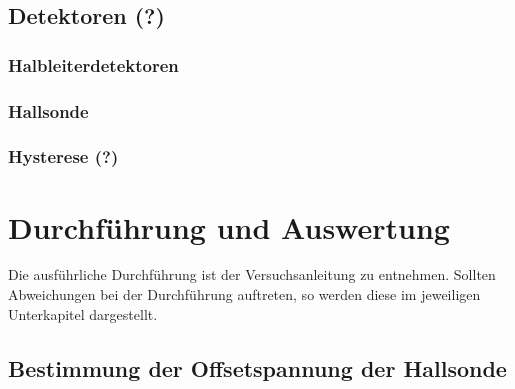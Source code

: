 \documentclass[11pt, a4paper]{article}
\numberwithin{equation}{section}
\begin{document}
\subsection{Detektoren (?)}
\subsubsection{Halbleiterdetektoren}

\subsubsection{Hallsonde}

\subsubsection{Hysterese (?)}


\section{Durchführung und Auswertung}
Die ausführliche Durchführung ist der Versuchsanleitung \cite{anleitung} zu entnehmen.
Sollten Abweichungen bei der Durchführung auftreten, so werden diese im jeweiligen Unterkapitel dargestellt.

\subsection{Bestimmung der Offsetspannung der Hallsonde}
\end{document}
